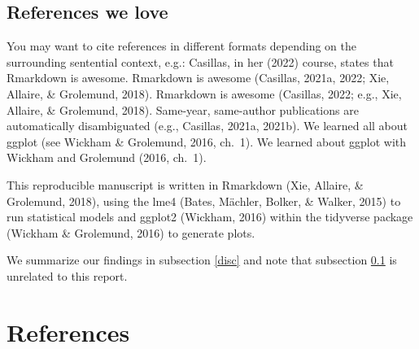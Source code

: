 \documentclass[
  english,
  man,floatsintext]{apa6}
\begin{document}
\hypertarget{refs}{%
\subsection{References we love}\label{refs}}

You may want to cite references in different formats depending on the surrounding sentential context, e.g.: Casillas, in her (2022) course, states that Rmarkdown is awesome. Rmarkdown is awesome (Casillas, 2021a, 2022; Xie, Allaire, \& Grolemund, 2018). Rmarkdown is awesome (Casillas, 2022; e.g., Xie, Allaire, \& Grolemund, 2018). Same-year, same-author publications are automatically disambiguated (e.g., Casillas, 2021a, 2021b). We learned all about ggplot (see Wickham \& Grolemund, 2016, ch.~1). We learned about ggplot with Wickham and Grolemund (2016, ch.~1).

This reproducible manuscript is written in Rmarkdown (Xie, Allaire, \& Grolemund, 2018), using the lme4 (Bates, Mächler, Bolker, \& Walker, 2015) to run statistical models and ggplot2 (Wickham, 2016) within the tidyverse package (Wickham \& Grolemund, 2016) to generate plots.

We summarize our findings in subsection \ref{disc} and note that subsection \ref{refs} is unrelated to this report.

\newpage

\hypertarget{references}{%
\section{References}\label{references}}

\begingroup
\setlength{\parindent}{-0.5in}
\setlength{\leftskip}{0.5in}
\end{document}
